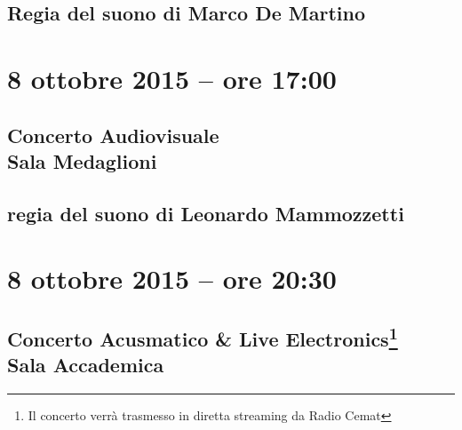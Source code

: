 \documentclass[8pt, twoside, a5paper]{extreport}
\begin{document}
{\fontsize{30}{30} }

\subsection*{\textsf{Regia del suono di Marco De Martino}}

\bigskip

\begin{multicols}{2}




\end{multicols}

\clearpage


\section*{8 ottobre 2015 -- ore 17:00}

\subsection*{{\small Concerto Audiovisuale} \\
	\textsf{Sala Medaglioni}}

{\fontsize{30}{30} }

\subsection*{\textsf{regia del suono di Leonardo Mammozzetti}}

\bigskip

\begin{multicols}{2}




\end{multicols}

\clearpage

\section*{8 ottobre 2015 -- ore 20:30}

\subsection*{{\small Concerto Acusmatico \& Live Electronics\footnote{ Il concerto verrà trasmesso in diretta streaming da Radio Cemat}} \\
	\textsf{Sala Accademica}}
\end{document}
